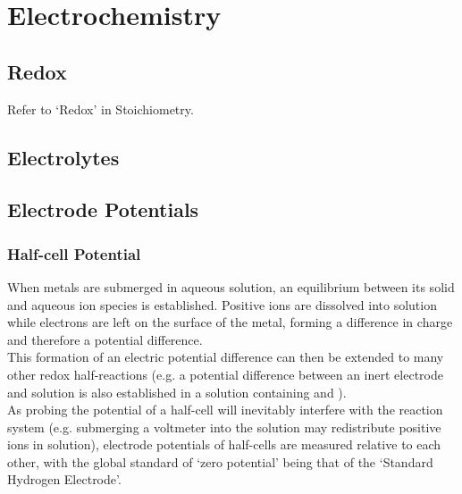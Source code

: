 \documentclass[../main]{subfiles}
\begin{document}
\section{Electrochemistry}

	\subsection{Redox}

	Refer to `Redox' in Stoichiometry.

	\subsection{Electrolytes}




	\subsection{Electrode Potentials}

	\subsubsection{Half-cell Potential}

	When metals are submerged in aqueous solution, an equilibrium between its solid and aqueous ion species is established. Positive ions are dissolved into solution while electrons are left on the surface of the metal, forming a difference in charge and therefore a potential difference. \\

	This formation of an electric potential difference can then be extended to many other redox half-reactions (e.g. a potential difference between an inert electrode and solution is also established in a solution containing  and ). \\

	As probing the potential of a half-cell will inevitably interfere with the reaction system (e.g. submerging a voltmeter into the solution may redistribute positive ions in solution), electrode potentials of half-cells are measured relative to each other, with the global standard of `zero potential' being that of the `Standard Hydrogen Electrode'. \\
\end{document}

